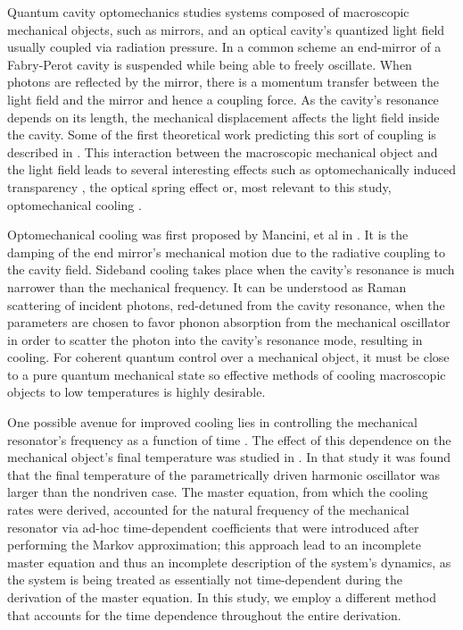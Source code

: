 \documentclass[reprint, amsmath,amssymb, aps,pra]{revtex4-1}
\begin{document}
Quantum cavity optomechanics studies systems composed of macroscopic
mechanical objects, such as mirrors, and an optical cavity's quantized
light field usually coupled via radiation pressure. In a common scheme
an end-mirror of a Fabry-Perot cavity is suspended while being able to
freely oscillate. When photons are reflected by the mirror, there is a
momentum transfer between the light field and the mirror and hence a
coupling force. As the cavity's resonance depends on its length, the
mechanical displacement affects the light field inside the cavity.
Some of the first theoretical work predicting this sort of coupling is
described in \cite{BraginskiiOG}. This interaction between the
macroscopic mechanical object and the light field leads to several
interesting effects such as optomechanically induced transparency
\cite{WeissOIT}, the optical spring effect \cite{VogelOT} or, most
relevant to this study, optomechanical cooling \cite{CohadonCM,
  CorbittOC, SchliesserRPC, LCNooshi, ManciniOC}.
	
Optomechanical cooling was first proposed by Mancini, et al in
\cite{ManciniOC}. It is the damping of the end mirror's mechanical
motion due to the radiative coupling to the cavity field. Sideband
cooling takes place when the cavity's resonance is much narrower than
the mechanical frequency. It can be understood as Raman scattering
\cite{MarquardtQTOQ} of incident photons, red-detuned from the cavity
resonance, when the parameters are chosen to favor phonon absorption
from the mechanical oscillator in order to scatter the photon into the
cavity's resonance mode, resulting in cooling. For coherent quantum
control over a mechanical object, it must be close to a pure quantum
mechanical state \cite{KippenberCO} so effective methods of cooling
macroscopic objects to low temperatures is highly desirable.

One possible avenue for improved cooling lies in controlling the
mechanical resonator's frequency as a function of time
\cite{JockelMR}. The effect of this dependence on the mechanical
object's final temperature was studied in \cite{BarberisLC}. In that
study it was found that the final temperature of the parametrically
driven harmonic oscillator was larger than the nondriven case. The
master equation, from which the cooling rates were derived, accounted
for the natural frequency of the mechanical resonator via ad-hoc
time-dependent coefficients that were introduced after performing the
Markov approximation; this approach lead to an incomplete master
equation and thus an incomplete description of the system's dynamics,
as the system is being treated as essentially not time-dependent
during the derivation of the master equation. In this study, we employ
a different method that accounts for the time dependence throughout
the entire derivation.
\end{document}
